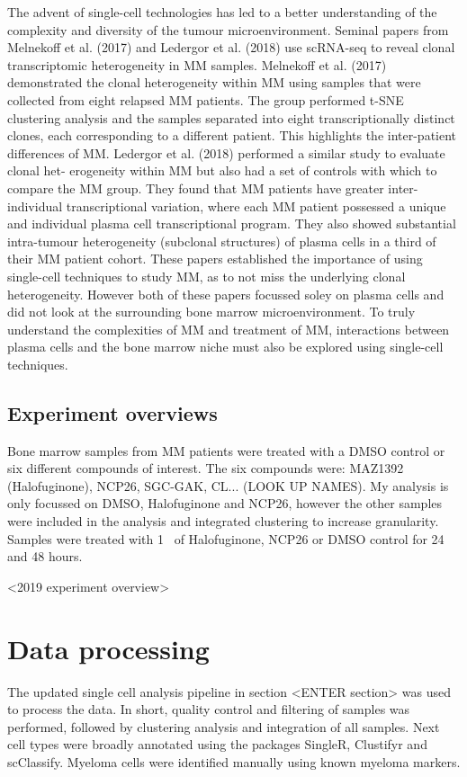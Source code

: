 The advent of single-cell technologies has led to a better understanding of the complexity and diversity of the tumour microenvironment.
Seminal papers from Melnekoff et al. (2017)\cite{melnekoff2017single} and Ledergor et al. (2018)\cite{ledergor2018single} use scRNA-seq to reveal clonal transcriptomic heterogeneity in MM samples.
Melnekoff et al. (2017) demonstrated the clonal heterogeneity within MM using samples that were collected from eight relapsed MM patients.
The group performed t-SNE clustering analysis and the samples separated into eight transcriptionally distinct clones, each corresponding to a different patient.
This highlights the inter-patient differences of MM\@.
Ledergor et al. (2018) performed a similar study to evaluate clonal het- erogeneity within MM but also had a set of controls with which to compare the MM group.
They found that MM patients have greater inter-individual transcriptional variation, where each MM patient possessed a unique and individual plasma cell transcriptional program.
They also showed substantial intra-tumour heterogeneity (subclonal structures) of plasma cells in a third of their MM patient cohort.
These papers established the importance of using single-cell techniques to study MM, as to not miss the underlying clonal heterogeneity.
However both of these papers focussed soley on plasma cells and did not look at the surrounding bone marrow microenvironment.
To truly understand the complexities of MM and treatment of MM, interactions between plasma cells and the bone marrow niche must also be explored using single-cell techniques.


\subsection{Experiment overviews}
Bone marrow samples from MM patients were treated with a DMSO control or six different compounds of interest.
The six compounds were: MAZ1392 (Halofuginone), NCP26, SGC-GAK, CL... (LOOK UP NAMES).
My analysis is only focussed on DMSO, Halofuginone and NCP26, however the other samples were included in the analysis and integrated clustering to increase  granularity.
Samples were treated with 1\si{\micro\Molar} of Halofuginone, NCP26 or DMSO control for 24 and 48 hours.

<2019 experiment overview>

\section{Data processing}
The updated single cell analysis pipeline in section <ENTER section> was used to process the data.
In short, quality control and filtering of samples was performed, followed by clustering analysis and integration of all samples.
Next cell types were broadly annotated using the packages SingleR, Clustifyr and scClassify.
Myeloma cells were identified manually using known myeloma markers.

